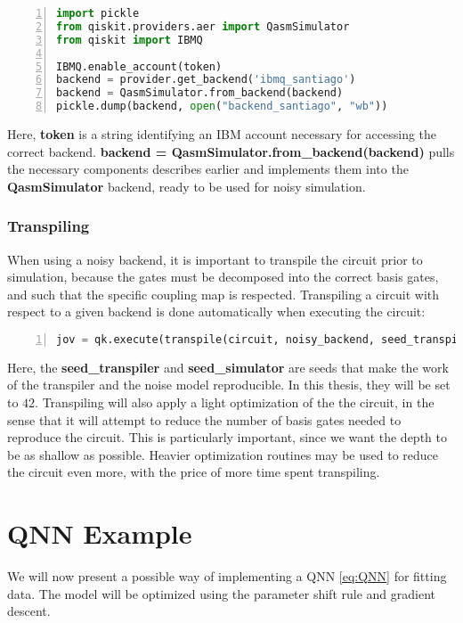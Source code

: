 \begin{lstlisting}[language=python, numbers=left]
import pickle
from qiskit.providers.aer import QasmSimulator
from qiskit import IBMQ

IBMQ.enable_account(token)
backend = provider.get_backend('ibmq_santiago')
backend = QasmSimulator.from_backend(backend)
pickle.dump(backend, open("backend_santiago", "wb"))
\end{lstlisting}

Here, \textbf{token} is a string identifying an IBM account necessary for accessing the correct backend. 
\textbf{backend = QasmSimulator.from\_backend(backend)} pulls the necessary components describes earlier and implements them into the \textbf{QasmSimulator} backend, ready to be used for noisy simulation. 

\subsubsection*{Transpiling}
When using a noisy backend, it is important to transpile the circuit prior to simulation, because the gates must be decomposed into the correct basis gates, and such that the specific coupling map is respected. Transpiling a circuit with respect to a given backend is done automatically when executing the circuit:

\begin{lstlisting}[language=python, numbers=left]
jov = qk.execute(transpile(circuit, noisy_backend, seed_transpiler=42, seed_simulator=42)
\end{lstlisting}
Here, the \textbf{seed\_transpiler} and \textbf{seed\_simulator} are seeds that make the work of the transpiler and the noise model reproducible. In this thesis, they will be set to $42$. Transpiling will also apply a light optimization of the the circuit, in the sense that it will attempt to reduce the number of basis gates needed to reproduce the circuit. This is particularly important, since we want the depth to be as shallow as possible. Heavier optimization routines may be used to reduce the circuit even more, with the price of more time spent transpiling.  






\section{QNN Example}\label{sec:QNNimpement}
We will now present a possible way of implementing a QNN \cref{eq:QNN} for fitting data. The model will be optimized using the parameter shift rule and gradient descent. 

